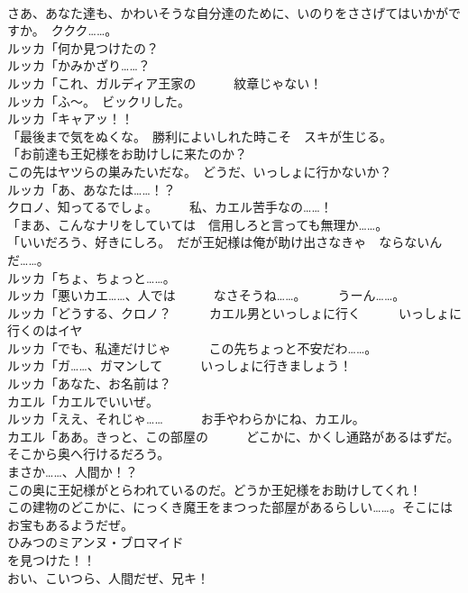 \documentclass[8pt]{extreport}
\begin{document}
\begin{CJK}{UTF8}{min}
\\	さあ、あなた達も、かわいそうな自分達のために、いのりをささげてはいかがですか。　ククク……。	
\\	ルッカ「何か見つけたの？	
\\	ルッカ「かみかざり……？	
\\	ルッカ「これ、ガルディア王家の　　　紋章じゃない！	
\\	ルッカ「ふ～。　ビックリした。	
\\	ルッカ「キャアッ！！	
\\	「最後まで気をぬくな。　勝利によいしれた時こそ　スキが生じる。	
\\	「お前達も王妃様をお助けしに来たのか？	
\\	この先はヤツらの巣みたいだな。　どうだ、いっしょに行かないか？	
\\	ルッカ「あ、あなたは……！？	
\\	クロノ、知ってるでしょ。　　　私、カエル苦手なの……！	
\\	「まあ、こんなナリをしていては　信用しろと言っても無理か……。	
\\	「いいだろう、好きにしろ。　だが王妃様は俺が助け出さなきゃ　ならないんだ……。	
\\	ルッカ「ちょ、ちょっと……。	
\\	ルッカ「悪いカエ……、人では　　　なさそうね……。　　　うーん……。	
\\	ルッカ「どうする、クロノ？　　　カエル男といっしょに行く　　　いっしょに行くのはイヤ	
\\	ルッカ「でも、私達だけじゃ　　　この先ちょっと不安だわ……。	
\\	ルッカ「ガ……、ガマンして　　　いっしょに行きましょう！	
\\	ルッカ「あなた、お名前は？	
\\	カエル「カエルでいいぜ。	
\\	ルッカ「ええ、それじゃ……　　　お手やわらかにね、カエル。	
\\	カエル「ああ。きっと、この部屋の　　　どこかに、かくし通路があるはずだ。　　　そこから奥へ行けるだろう。	
\\	まさか……、人間か！？	
\\	この奥に王妃様がとらわれているのだ。どうか王妃様をお助けしてくれ！	
\\	この建物のどこかに、にっくき魔王をまつった部屋があるらしい……。そこにはお宝もあるようだぜ。	
\\	ひみつのミアンヌ・ブロマイド
\\	を見つけた！！	
\\	おい、こいつら、人間だぜ、兄キ！	

\end{CJK}
\end{document}
